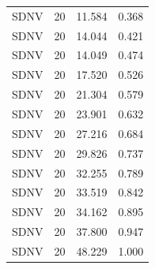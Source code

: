 \begin{table}[t]
\begin{tabular}{lrrr}
SDNV & 20 & 11.584 & 0.368\\
SDNV & 20 & 14.044 & 0.421\\
SDNV & 20 & 14.049 & 0.474\\
SDNV & 20 & 17.520 & 0.526\\
SDNV & 20 & 21.304 & 0.579\\
SDNV & 20 & 23.901 & 0.632\\
SDNV & 20 & 27.216 & 0.684\\
SDNV & 20 & 29.826 & 0.737\\
SDNV & 20 & 32.255 & 0.789\\
SDNV & 20 & 33.519 & 0.842\\
SDNV & 20 & 34.162 & 0.895\\
SDNV & 20 & 37.800 & 0.947\\
SDNV & 20 & 48.229 & 1.000\\
\hline
\end{tabular}
\end{table}
